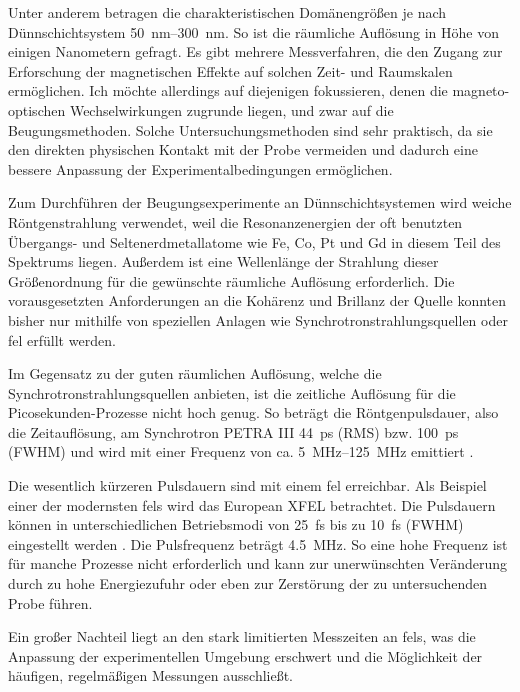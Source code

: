 \noindent
Unter anderem betragen die charakteristischen Domänengrößen je nach Dünnschichtsystem \SIrange[range-units = single]{50}{300}{\nano\meter}. So ist die räumliche Auflösung in Höhe von einigen Nanometern gefragt. Es gibt mehrere Messverfahren, die den Zugang zur Erforschung der magnetischen Effekte auf solchen Zeit- und Raumskalen ermöglichen. Ich möchte allerdings auf diejenigen fokussieren, denen die magneto-optischen Wechselwirkungen zugrunde liegen, und zwar auf die Beugungsmethoden. Solche Untersuchungsmethoden sind sehr praktisch, da sie den direkten physischen Kontakt mit der Probe vermeiden und dadurch eine bessere Anpassung der Experimentalbedingungen ermöglichen.

\noindent
Zum Durchführen der Beugungsexperimente an Dünnschichtsystemen wird weiche Röntgenstrahlung verwendet, weil die Resonanzenergien der oft benutzten Übergangs- und Seltenerdmetallatome wie Fe, Co, Pt und Gd in diesem Teil des Spektrums liegen. Außerdem ist eine Wellenlänge der Strahlung dieser Größenordnung für die gewünschte räumliche Auflösung erforderlich. Die vorausgesetzten Anforderungen an die Kohärenz und Brillanz der Quelle konnten bisher nur mithilfe von speziellen Anlagen wie Synchrotronstrahlungsquellen oder \gls{fel} erfüllt werden.  %

\noindent
Im Gegensatz zu der guten räumlichen Auflösung, welche die Synchrotronstrahlungsquellen anbieten, ist die zeitliche Auflösung für die Picosekunden-Prozesse nicht hoch genug. So beträgt die Röntgenpulsdauer, also die Zeitauflösung, am Synchrotron PETRA III \SI{44}{\pico\second} (RMS) bzw. \SI{100}{\pico\second} (FWHM) und wird mit einer Frequenz von ca. \SIrange[range-units = single]{5}{125}{\mega\hertz} emittiert \cite{noauthor_machine_nodate}.

\noindent
Die wesentlich kürzeren Pulsdauern sind mit einem \gls{fel} erreichbar. Als Beispiel einer der mo\-dern\-sten \gls{fel}s wird das European XFEL betrachtet. Die Pulsdauern können in unterschiedlichen Betriebsmodi von \SI{25}{\femto\second} bis zu \SI{10}{\femto\second} (FWHM) eingestellt werden \cite{tschentscher_photon_2017}. Die Pulsfrequenz beträgt \SI{4,5}{\mega\hertz}. So eine hohe Frequenz ist für manche Prozesse nicht erforderlich und kann zur unerwünschten Veränderung durch zu hohe Energiezufuhr oder eben zur Zerstörung der zu untersuchenden Probe führen. 

\noindent
Ein großer Nachteil liegt an den stark limitierten Messzeiten an \gls{fel}s, was die Anpassung der experimentellen Umgebung erschwert und die Möglichkeit der häufigen, regelmäßigen Messungen ausschließt.

